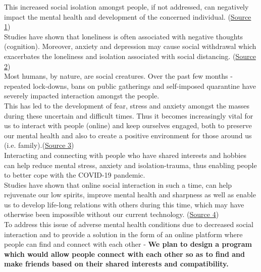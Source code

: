 \documentclass[11pt]{report}
\begin{document}
This increased social isolation amongst people, if not addressed, can negatively impact the mental health and development of the concerned individual. (\href{https://www.healthline.com/health-news/people-with-covid-19-more-likely-to-develop-depression-anxiety-and-dementia\#How-the-new-coronavirus-affects-the-mind}{\color{blue}Source 1})\\

Studies have shown that loneliness is often associated with negative thoughts (cognition). Moreover, anxiety and depression may cause social withdrawal which exacerbates the loneliness and isolation associated with social distancing.
(\href{https://www.ncbi.nlm.nih.gov/pmc/articles/PMC7306546/\#:\\~:text=Quarantine\%20and\%20social\%20distancing\%20are,and\%20mental\%2Dhealth\%20related\%20repercussions}{\color{blue}Source 2})\\ 

Most humans, by nature, are social creatures. Over the past few months - repeated lock-downs, bans on public gatherings and self-imposed quarantine have severely impacted interaction amongst the people.\\

This has led to the development of fear, stress and anxiety amongst the masses during these uncertain and difficult times. Thus it becomes increasingly vital for us to interact with people (online) and keep ourselves engaged, both to preserve our mental health and also to create a positive environment for those around us (i.e. family).(\href{https://www.kff.org/coronavirus-covid-19/issue-brief/the-implications-of-covid-19-for-mental-health-and-substance-use/}{\color{blue}Source 3})\\

Interacting and connecting with people who have shared interests and hobbies can help reduce mental stress, anxiety and isolation-trauma, thus enabling people to better cope with the COVID-19 pandemic.\\

Studies have shown that online social interaction in such a time, can help rejuvenate our low spirits, improve mental health and sharpness as well as enable us to develop life-long relations with others during this time, which may have otherwise been impossible without our current technology. 
(\href{https://oaksatdenville.org/blog/benefits-social-interactions/}{\color{blue}Source 4})\\

To address this issue of adverse mental health conditions due to decreased social interaction and to provide a solution in the form of an online platform where people can find and connect with each other - {\textbf {\large We plan to design a program which would allow people connect with each other so as to find and make friends based on their shared interests and compatibility.}}
\end{document}
